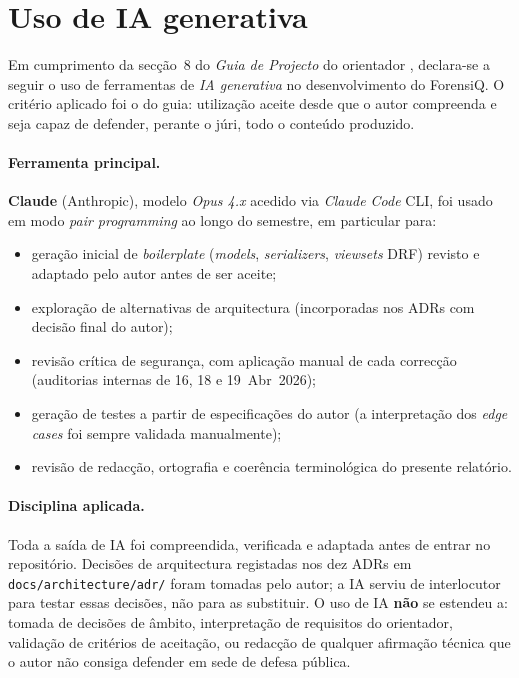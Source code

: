 \documentclass[a4paper,11pt]{article}
\begin{document}




\section*{Uso de IA generativa}

Em cumprimento da secção~8 do \emph{Guia de Projecto} do orientador
\citep{pestana2026guia}, declara-se a seguir o uso de ferramentas de
\emph{IA generativa} no desenvolvimento do ForensiQ. O critério aplicado
foi o do guia: utilização aceite desde que o autor compreenda e seja
capaz de defender, perante o júri, todo o conteúdo produzido.

\paragraph{Ferramenta principal.} \textbf{Claude} (Anthropic), modelo
\emph{Opus 4.x} acedido via \emph{Claude Code} CLI, foi usado em modo
\emph{pair programming} ao longo do semestre, em particular para:
\begin{itemize}
    \item geração inicial de \emph{boilerplate} (\emph{models}, \emph{serializers}, \emph{viewsets} DRF) revisto e adaptado pelo autor antes de ser aceite;
    \item exploração de alternativas de arquitectura (incorporadas nos ADRs com decisão final do autor);
    \item revisão crítica de segurança, com aplicação manual de cada correcção (auditorias internas de 16, 18 e 19~Abr~2026);
    \item geração de testes a partir de especificações do autor (a interpretação dos \emph{edge cases} foi sempre validada manualmente);
    \item revisão de redacção, ortografia e coerência terminológica do presente relatório.
\end{itemize}

\paragraph{Disciplina aplicada.} Toda a saída de IA foi compreendida,
verificada e adaptada antes de entrar no repositório. Decisões de
arquitectura registadas nos dez ADRs em
\texttt{docs/architecture/adr/} foram tomadas pelo autor; a IA serviu
de interlocutor para testar essas decisões, não para as substituir. O
uso de IA \textbf{não} se estendeu a: tomada de decisões de âmbito,
interpretação de requisitos do orientador, validação de critérios de
aceitação, ou redacção de qualquer afirmação técnica que o autor não
consiga defender em sede de defesa pública.
\end{document}

